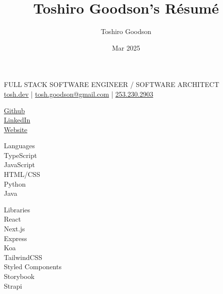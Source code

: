 \documentclass{resume}
\title{Toshiro Goodson's Résumé}
\author{Toshiro Goodson}
\date{Mar 2025}
\begin{document}
\color{content}
\begin{spacing}{1.2}
	\begin{paracol}{2}
		\switchcolumn
		\color{subcontent}
		\begin{spacing}{0.9}
			{\Huge {}}
		\end{spacing}
		FULL STACK SOFTWARE ENGINEER / SOFTWARE ARCHITECT\\
		\href{https://tosh.dev}{tosh.dev} | \href{mailto:tosh.goodson@gmail.com}{tosh.goodson@gmail.com} | \href{tel:2532302903}{253.230.2903}
	\end{paracol}

	\bigskip
	\bigskip

	\begin{paracol}{2}
		\begin{flushright}
			\small {}

			\begin{spacing}{1.1}
				\href{https://github.com/toshgoodson/}{Github}\\
				\href{https://www.linkedin.com/in/toshgoodson/}{LinkedIn}\\
				\href{https://tosh.dev}{Website}

				\bigskip

				\small {}

				{\color{subcontent} \footnotesize Languages}\\
				\smallskip
				TypeScript\\
				JavaScript\\
				HTML/CSS\\
				Python\\
				Java

				\medskip

				{\color{subcontent} \footnotesize Libraries}\\
				\smallskip
				React\\
				Next.js\\
				Express\\
				Koa\\
				TailwindCSS\\
				Styled Components\\
				Storybook\\
				Strapi


\end{spacing}
\end{flushright}
\end{paracol}
\end{spacing}
\end{document}
